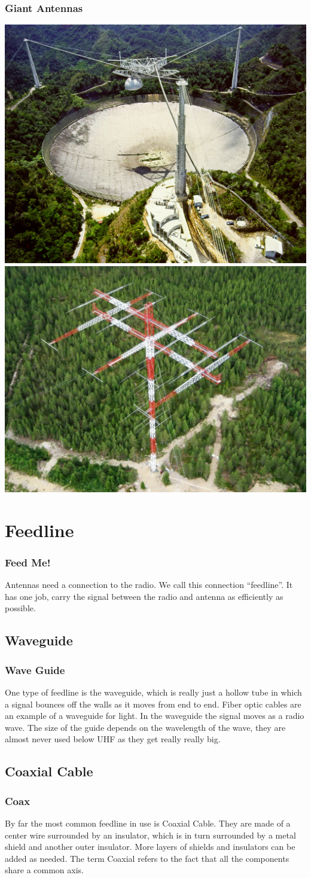 \documentclass[10pt]{beamer}
\begin{document}
\begin{frame}
\frametitle{Giant Antennas}
\includegraphics[width=.49\textwidth]{arecibo.jpg}
\includegraphics[width=.49\textwidth]{160myagi.jpg}
\end{frame}

\section{Feedline}
\begin{frame}
\frametitle{Feed Me!}
Antennas need a connection to the radio. We call this connection ``feedline''. It has one job, carry the signal between the radio and antenna as efficiently as possible.
\end{frame}

\subsection{Waveguide}
\begin{frame}
\frametitle{Wave Guide}
One type of feedline is the waveguide, which is really just a hollow tube in which a signal bounces off the walls as it moves from end to end. Fiber optic cables are an example of a waveguide for light. In the waveguide the signal moves as a radio wave. The size of the guide depends on the wavelength of the wave, they are almost never used below UHF as they get really really big. 
\end{frame}

\subsection{Coaxial Cable}
\begin{frame}
\frametitle{Coax}
By far the most common feedline in use is Coaxial Cable. They are made of a center wire surrounded by an insulator, which is in turn surrounded by a metal shield and another outer insulator. More layers of shields and insulators can be added as needed. The term Coaxial refers to the fact that all the components share a common axis.
\end{frame}
\end{document}
